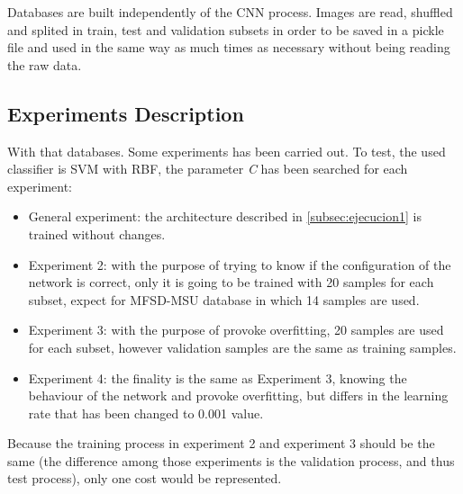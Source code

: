 Databases are built independently of the CNN process. Images are read, shuffled and splited in train, test and validation subsets in order to be saved in a pickle file and used in the same way as much times as necessary without being reading the raw data.

\subsection{Experiments Description}
With that databases. Some experiments has been carried out. To test, the used classifier is SVM with RBF, the parameter \textit{C} has been searched for each experiment:

\begin{itemize}
\item General experiment: the architecture described in \ref{subsec:ejecucion1} is trained without changes.
\item Experiment 2: with the purpose of trying to know if the configuration of the network is correct, only it is going to be trained with 20 samples for each subset, expect for MFSD-MSU database in which 14 samples are used.
\item Experiment 3: with the purpose of provoke overfitting, 20 samples are used for each subset, however validation samples are the same as training samples.
\item Experiment 4: the finality is the same as Experiment 3, knowing the behaviour of the network and provoke overfitting, but differs in the learning rate that has been changed to 0.001 value. \\
\end{itemize}

Because the training process in experiment 2 and experiment 3 should be the same (the difference among those experiments is the validation process, and thus test process), only one cost would be represented.\\

